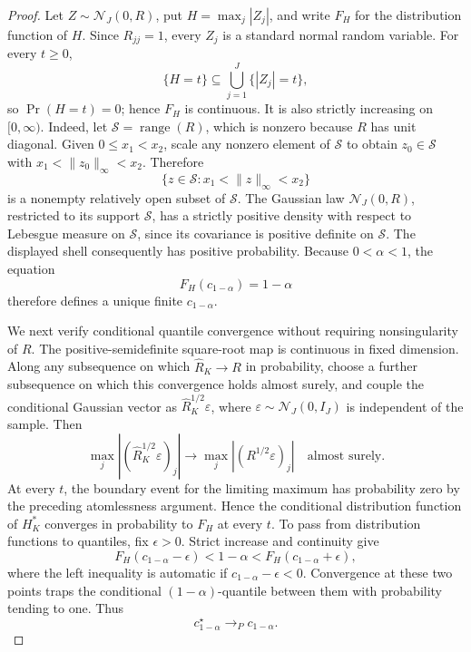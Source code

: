\documentclass{article}
\begin{document}
\begin{proof}
Let \(Z\sim\mathcal N_J(0,R)\), put \(H=\max_j|Z_j|\), and write \(F_H\) for the distribution function of \(H\).  Since \(R_{jj}=1\), every \(Z_j\) is a standard normal random variable.  For every \(t\ge0\),
\[
 \{H=t\}\subseteq\bigcup_{j=1}^J\{|Z_j|=t\},
\]
so \(\Pr(H=t)=0\); hence \(F_H\) is continuous.  It is also strictly increasing on \([0,\infty)\).  Indeed, let \(\mathcal S=\operatorname{range}(R)\), which is nonzero because \(R\) has unit diagonal.  Given \(0\le x_1<x_2\), scale any nonzero element of \(\mathcal S\) to obtain \(z_0\in\mathcal S\) with
\(x_1<\|z_0\|_\infty<x_2\).  Therefore
\[
 \{z\in\mathcal S:x_1<\|z\|_\infty<x_2\}
\]
is a nonempty relatively open subset of \(\mathcal S\).  The Gaussian law \(\mathcal N_J(0,R)\), restricted to its support \(\mathcal S\), has a strictly positive density with respect to Lebesgue measure on \(\mathcal S\), since its covariance is positive definite on \(\mathcal S\).  The displayed shell consequently has positive probability.  Because \(0<\alpha<1\), the equation
\[
 F_H(c_{1-\alpha})=1-\alpha
\]
therefore defines a unique finite \(c_{1-\alpha}\).

We next verify conditional quantile convergence without requiring nonsingularity of \(R\).  The positive-semidefinite square-root map is continuous in fixed dimension.  Along any subsequence on which \(\widehat R_K\to R\) in probability, choose a further subsequence on which this convergence holds almost surely, and couple the conditional Gaussian vector as \(\widehat R_K^{1/2}\varepsilon\), where \(\varepsilon\sim\mathcal N_J(0,I_J)\) is independent of the sample.  Then
\[
 \max_j| (\widehat R_K^{1/2}\varepsilon)_j|
 \longrightarrow
 \max_j|(R^{1/2}\varepsilon)_j|
 \quad\text{almost surely}.
\]
At every \(t\), the boundary event for the limiting maximum has probability zero by the preceding atomlessness argument.  Hence the conditional distribution function of \(H_K^*\) converges in probability to \(F_H\) at every \(t\).  To pass from distribution functions to quantiles, fix \(\epsilon>0\).  Strict increase and continuity give
\[
 F_H(c_{1-\alpha}-\epsilon)<1-\alpha
 <F_H(c_{1-\alpha}+\epsilon),
\]
where the left inequality is automatic if \(c_{1-\alpha}-\epsilon<0\).  Convergence at these two points traps the conditional \((1-\alpha)\)-quantile between them with probability tending to one.  Thus
\[
 c_{1-\alpha}^\star\longrightarrow_Pc_{1-\alpha}.
\]


\end{proof}
\end{document}
